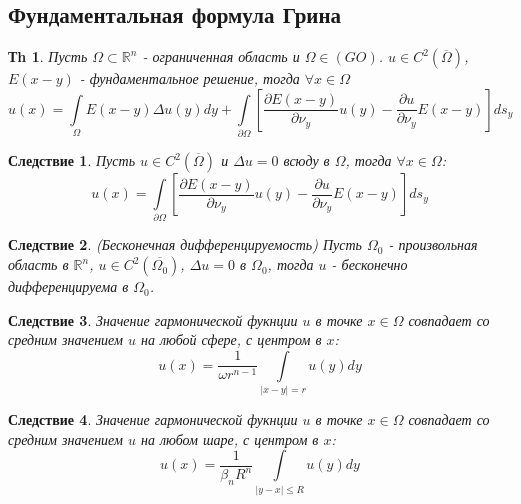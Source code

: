 \documentclass[14pt]{article}
\theoremstyle{plain}
\newtheorem{Thm}{Тh}
\newtheorem{Sled}{Следствие}
\theoremstyle{definition}
\begin{document}
		\subsection{Фундаментальная формула Грина}
		\begin{Thm}
			Пусть $\Omega \subset \mathbb{R}^n$ - ограниченная область и $\Omega \in (GO)$. $u \in C^2(\overline{\Omega})$, $E(x-y)$ - фундаментальное решение, тогда $\forall x \in \Omega$ 
			$$
				u(x) = \int\limits_{\Omega} E(x-y) \Delta u(y) dy + \int\limits_{\partial \Omega} \left[\dfrac{\partial E(x-y)}{\partial \nu_y} u(y) - \dfrac{\partial u}{\partial \nu_y } E(x-y)\right] ds_y
			$$	
		\end{Thm}	
		\begin{Sled}
			Пусть $u \in C^2(\overline{\Omega})$ и $\Delta u = 0$ всюду в $\Omega$, тогда $\forall x \in \Omega$:
			$$
			u(x) = \int\limits_{\partial \Omega} \left[\dfrac{\partial E(x-y)}{\partial \nu_y} u(y) - \dfrac{\partial u}{\partial \nu_y } E(x-y)\right] ds_y
			$$
		\end{Sled}
		\begin{Sled}
			(Бесконечная дифференцируемость) \newline
			Пусть $\Omega_0$ - произвольная область в $\mathbb{R}^n$, $u \in C^2(\overline{\Omega_0})$, $\Delta u = 0$ в $\Omega_0$, тогда $u$ - бесконечно дифференцируема в $\Omega_0$. 
		\end{Sled}
		\begin{Sled}
			Значение гармонической фукнции $u$ в точке $x \in \Omega$ совпадает со средним значением $u$ на любой сфере, с центром в $x$:
			$$
				u(x) = \dfrac{1}{\omega r^{n-1}}\int\limits_{|x-y| = r} u(y) dy
			$$			
		\end{Sled}
	\begin{Sled}
		Значение гармонической фукнции $u$ в точке $x \in \Omega$ совпадает со средним значением $u$ на любом шаре, с центром в $x$:
		$$
		u(x) = \dfrac{1}{\beta_n R^n}\int\limits_{|y-x| \leq R} u(y) dy
		$$			
	\end{Sled}
\end{document}
